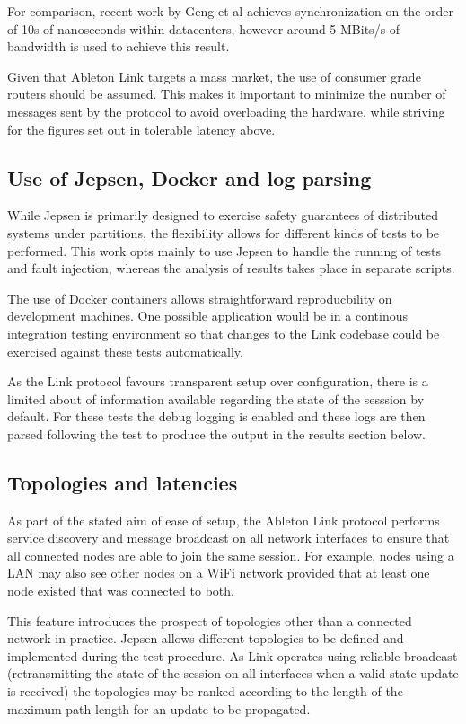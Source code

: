 \documentclass[11pt]{article} %
\theoremstyle{plain}
\theoremstyle{definition}
\begin{document}
For comparison, recent work by Geng et al\cite{geng2018} achieves
synchronization on the order of 10s of nanoseconds within datacenters, however
around 5 MBits/s of bandwidth is used to achieve this result.

Given that Ableton Link targets a mass market, the use of consumer grade
routers should be assumed. This makes it important to minimize the number of
messages sent by the protocol to avoid overloading the hardware, while striving
for the figures set out in tolerable latency above.

\subsection{Use of Jepsen, Docker and log parsing}

While Jepsen is primarily designed to exercise safety guarantees of distributed
systems under partitions, the flexibility allows for different kinds of tests
to be performed. This work opts mainly to use Jepsen to handle the running of
tests and fault injection, whereas the analysis of results takes place in
separate scripts.

The use of Docker containers allows straightforward reproducbility on
development machines. One possible application would be in a continous
integration testing environment so that changes to the Link codebase could be
exercised against these tests automatically.

As the Link protocol favours transparent setup over configuration, there is a
limited about of information available regarding the state of the sesssion by
default. For these tests the debug logging is enabled and these logs are then
parsed following the test to produce the output in the results section below.

\subsection{Topologies and latencies}

As part of the stated aim of ease of setup, the Ableton Link protocol performs
service discovery and message broadcast on all network interfaces to ensure
that all connected nodes are able to join the same session. For example, nodes
using a LAN may also see other nodes on a WiFi network provided that at least
one node existed that was connected to both.

This feature introduces the prospect of topologies other than a connected
network in practice. Jepsen allows different topologies to be defined and
implemented during the test procedure. As Link operates using reliable
broadcast (retransmitting the state of the session on all interfaces when a
valid state update is received) the topologies may be ranked according to the
length of the maximum path length for an update to be propagated.
\end{document}
